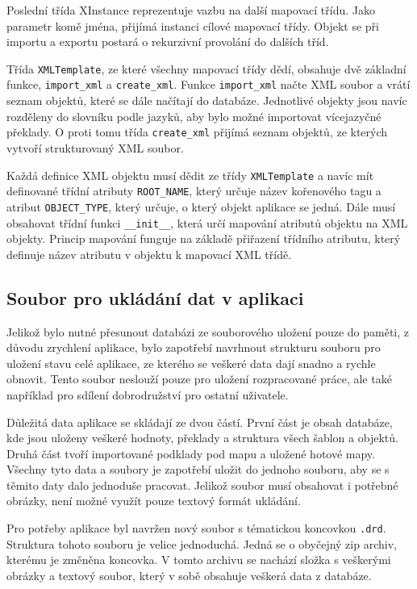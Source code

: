 \documentclass[thesis=B,czech]{resources/FITthesis}[2012/06/26]
\begin{document}
Poslední třída XInstance reprezentuje vazbu na další mapovací třídu. Jako parametr komě jména, přijímá instanci cílové mapovací třídy. Objekt se při importu a exportu postará o rekurzivní provolání do dalších tříd. \par

Třída \texttt{XMLTemplate}, ze které všechny mapovací třídy dědí, obsahuje dvě základní funkce, \texttt{import\_xml} a \texttt{create\_xml}. Funkce \texttt{import\_xml} načte XML soubor a vrátí seznam objektů, které se dále načítají do databáze. Jednotlivé objekty jsou navíc rozděleny do slovníku podle jazyků, aby bylo možné importovat vícejazyčné překlady. O proti tomu třída \texttt{create\_xml} přijímá seznam objektů, ze kterých vytvoří strukturovaný XML soubor. \par

Každá definice XML objektu musí dědit ze třídy \texttt{XMLTemplate} a navíc mít definované třídní atributy \texttt{ROOT\_NAME}, který určuje název kořenového tagu a atribut \texttt{OBJECT\_TYPE}, který určuje, o který objekt aplikace se jedná. Dále musí obsahovat třídní funkci \texttt{\_\_init\_\_}, která určí mapování atributů objektu na XML objekty. Princip mapování funguje na základě přiřazení třídního atributu, který definuje název atributu v objektu k mapovací XML třídě. 

	\subsection{Soubor pro ukládání dat v aplikaci}
Jelikož bylo nutné přesunout databázi ze souborového uložení pouze do paměti, z důvodu zrychlení aplikace, bylo zapotřebí navrhnout strukturu souboru pro uložení stavu celé aplikace, ze kterého se veškeré data dají snadno a rychle obnovit. Tento soubor neslouží pouze pro uložení rozpracované práce, ale také například pro sdílení dobrodružství pro ostatní uživatele. \par

Důležitá data aplikace se skládají ze dvou částí. První část je obsah databáze, kde jsou uloženy veškeré hodnoty, překlady a struktura všech šablon a objektů. Druhá část tvoří importované podklady pod mapu a uložené hotové mapy. Všechny tyto data a soubory je zapotřebí uložit do jednoho souboru, aby se s těmito daty dalo jednoduše pracovat. Jelikož soubor musí obsahovat i potřebné obrázky, není možné využít pouze textový formát ukládání. \par

Pro potřeby aplikace byl navržen nový soubor s tématickou koncovkou \texttt{.drd}. Struktura tohoto souboru je velice jednoduchá. Jedná se o obyčejný zip archiv, kterému je změněna koncovka. V tomto archivu se nachází složka s veškerými obrázky a textový soubor, který v sobě obsahuje veškerá data z databáze. \par
\end{document}
